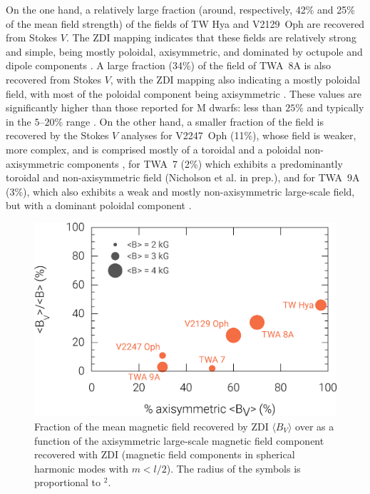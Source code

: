\documentclass{aa}
\begin{document}
On the one hand, a relatively large fraction (around, respectively, 42\% and 25\% of the mean field strength) of the fields of TW Hya and V2129~Oph are recovered from Stokes $V$. The ZDI mapping indicates that these fields are relatively strong and simple, being mostly poloidal, axisymmetric, and dominated by octupole and dipole components \citep{2011donati-twhya,2011donati-v2129oph}. A large fraction (34\%) of the field of TWA~8A is also recovered from Stokes $V$, with the ZDI mapping also indicating a mostly poloidal field, with most of the poloidal component being axisymmetric \citep{2019MNRAS.tmp..410H}. These values are significantly higher than  those reported for M dwarfs: less than $25\%$ and typically in the $5$--$20$\% range \citep{2009A&A...496..787R,2012LRSP....9....1R,2019ApJ...873...69K}. On the other hand, a smaller fraction of the field is recovered by the Stokes $V$ analyses for V2247~Oph (11\%), whose field is weaker, more complex, and is comprised mostly of a toroidal and a poloidal non-axisymmetric components \citep{2010donati-v2247oph}, for TWA~7 (2\%) which exhibits a predominantly toroidal and non-axisymmetric field (Nicholson et al. in prep.), and for TWA~9A (3\%), which also exhibits a weak and mostly non-axisymmetric large-scale field, but with a dominant poloidal component \citep{2018MNRAS.480.1754N}. 
\begin{figure}
\centering
\includegraphics[width=1.0\columnwidth]{axisymmetric2.eps}
\caption{
    Fraction of the mean magnetic field recovered by ZDI $\langle B_V \rangle$ over {\bb} as a function of the axisymmetric large-scale magnetic field component recovered with ZDI (magnetic field components in spherical harmonic modes with $m<l/2$). The radius of the symbols is proportional to {\bb}$^2$.}
\label{figure:axisymmetry}
\end{figure}
\end{document}
